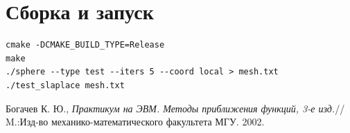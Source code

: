 \documentclass[a4paper,article]{article}
\begin{document}
\section{Сборка и запуск}
\begin{verbatim}
cmake -DCMAKE_BUILD_TYPE=Release
make
./sphere --type test --iters 5 --coord local > mesh.txt
./test_slaplace mesh.txt
\end{verbatim}

\begin{thebibliography}{999}
 Богачев К. Ю., {\it  Практикум на ЭВМ.  Методы
    приближения функций, 3-е изд.}// M.:Изд-во
  механико-математического факультета МГУ. 2002.

\end{thebibliography}
\end{document}
